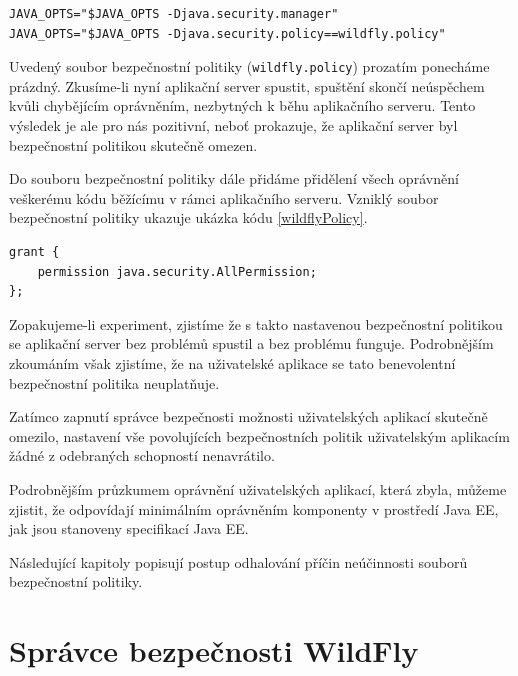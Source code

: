 \begin{lstlisting}[caption=Doplnění spouštěcího skriptu o použití správce bezpečnosti, label=wildflySeSM]
JAVA_OPTS="$JAVA_OPTS -Djava.security.manager"
JAVA_OPTS="$JAVA_OPTS -Djava.security.policy==wildfly.policy"
\end{lstlisting}

Uvedený soubor bezpečnostní politiky ({\tt wildfly.policy}) prozatím ponecháme prázdný.
Zkusíme-li nyní aplikační server spustit, spuštění skončí neúspěchem kvůli chybějícím oprávněním, nezbytných k běhu aplikačního serveru. Tento výsledek je ale pro nás pozitivní, neboť prokazuje, že aplikační server byl bezpečnostní politikou skutečně omezen.

Do souboru bezpečnostní politiky dále přidáme přidělení všech oprávnění veškerému kódu běžícímu v rámci aplikačního serveru. Vzniklý soubor bezpečnostní politiky ukazuje ukázka kódu \ref{wildflyPolicy}.

\begin{lstlisting}[caption=První testovací soubor bezpečnostní politiky, label=wildflyPolicy]
grant {
    permission java.security.AllPermission;
};
\end{lstlisting}

Zopakujeme-li experiment, zjistíme že s takto nastavenou bezpečnostní politikou se aplikační server bez problémů spustil a bez problému funguje.
Podrobnějším zkoumáním však zjistíme, že na uživatelské aplikace se tato benevolentní bezpečnostní politika neuplatňuje.

Zatímco zapnutí správce bezpečnosti možnosti uživatelských aplikací skutečně omezilo, nastavení vše povolujících bezpečnostních politik uživatelským
aplikacím žádné z odebraných schopností nenavrátilo.

Podrobnějším průzkumem oprávnění uživatelských aplikací, která zbyla, můžeme zjistit, že odpovídají minimálním oprávněním komponenty v prostředí Java EE,
jak jsou stanoveny specifikací Java EE. \cite[tabulka EE.6-2]{javaEEspec}

Následující kapitoly popisují postup odhalování příčin neúčinnosti souborů bezpečnostní politiky.

\section{Správce bezpečnosti WildFly} \label{wildFlySecurityManager}

